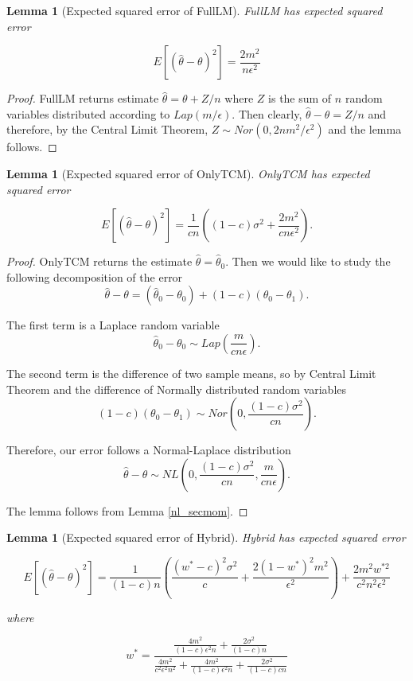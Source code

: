 \documentclass{article}
\theoremstyle{plain}
\newtheorem{lem}[thm]{Lemma}
\begin{document}
\begin{lem}[Expected squared error of FullLM]
\label{MSE_FullLM}
FullLM has expected squared error

$$E[(\hat{\theta} - \theta)^2] = \frac{2m^2}{n\epsilon^2}$$
\end{lem}

\begin{proof}
FullLM returns estimate $\hat{\theta} = \theta + Z/n$ where $Z$ is the sum of $n$ random variables distributed according to $Lap(m/\epsilon)$. Then clearly, $\hat{\theta} - \theta = Z/n$ and therefore, by the Central Limit Theorem, $Z \sim Nor(0, 2nm^2/\epsilon^2)$ and the lemma follows. 
\end{proof}

\begin{lem}[Expected squared error of OnlyTCM]
\label{MSE_OnlyTCM}
OnlyTCM has expected squared error

$$E[(\hat{\theta} - \theta)^2] = \frac{1}{cn}\left((1-c)\sigma^2 + \frac{2m^2}{cn \epsilon^2 }\right).$$
\end{lem}

\begin{proof}
OnlyTCM returns the estimate $\hat{\theta} = \hat{\theta}_0$. Then we would like to study the following decomposition of the error
$$\hat{\theta} - \theta = (\hat{\theta}_0 - \theta_0) + (1-c)(\theta_0 - \theta_1).$$

The first term is a Laplace random variable
$$\hat{\theta}_0 - \theta_0 \sim Lap\left(\frac{m}{cn\epsilon}\right).$$

The second term is the difference of two sample means, so by Central Limit Theorem and the difference of Normally distributed random variables
$$(1-c)(\theta_0 - \theta_1) \sim Nor\left(0, \frac{(1-c)\sigma^2}{cn}\right).$$

Therefore, our error follows a Normal-Laplace distribution
$$\hat{\theta} - \theta \sim NL\left(0, \frac{(1-c)\sigma^2}{cn}, \frac{m}{cn\epsilon} \right).$$

The lemma follows from Lemma \ref{nl_secmom}.
\end{proof}

\begin{lem}[Expected squared error of Hybrid]
Hybrid has expected squared error 

$$E[(\hat{\theta} - \theta)^2] = \frac{1}{(1-c)n}\left(\frac{(w^*-c)^2\sigma^2}{c} + \frac{2(1-w^*)^2 m^2}{\epsilon^2}\right) + \frac{2m^2w^{*2}}{c^2n^2\epsilon^2}$$

where

$$w^* = \frac{\frac{4 m^2}{(1-c) \epsilon^2 n}+\frac{2 \sigma^2}{(1-c) n}}{\frac{4 m^2}{c^2 \epsilon^2 n^2}+\frac{4 m^2}{(1-c) \epsilon^2 n}+\frac{2 \sigma^2}{(1-c) c n}}$$
\end{lem}
\end{document}
